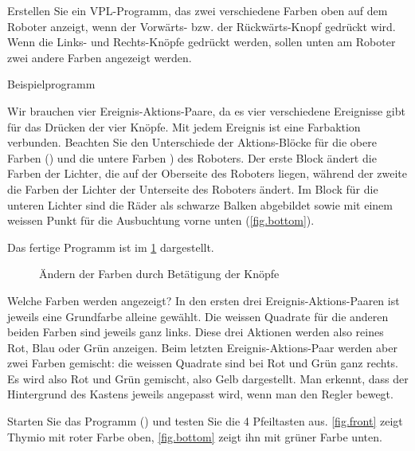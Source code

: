 
\label{ch.colors}


Erstellen Sie ein VPL-Programm, das zwei verschiedene Farben oben auf dem Roboter anzeigt, wenn der Vorwärts- bzw. der Rückwärts-Knopf gedrückt wird. Wenn die Links- und Rechts-Knöpfe gedrückt werden, sollen unten am Roboter zwei andere Farben angezeigt werden.

{\raggedleft \hfill Beispielprogramm }

Wir brauchen vier Ereignis-Aktions-Paare, da es vier verschiedene
Ereignisse gibt für das Drücken der vier Knöpfe. Mit jedem Ereignis ist eine Farbaktion verbunden. Beachten Sie den Unterschiede der Aktions-Blöcke für die obere Farben () und die untere Farben ) des Roboters. Der erste Block ändert die Farben der Lichter, die auf der Oberseite des Roboters liegen, während der zweite die Farben der Lichter der Unterseite des Roboters ändert. Im Block für die unteren Lichter sind die Räder als schwarze Balken abgebildet sowie mit einem weissen Punkt für die Ausbuchtung vorne unten (\cref{fig.bottom}).

Das fertige Programm ist im \cref{fig.colors} dargestellt.

\begin{figure}
	\caption{Ändern der Farben durch Betätigung der Knöpfe}\label{fig.colors}
\end{figure}

Welche Farben werden angezeigt? In den ersten drei Ereignis-Aktions-Paaren ist jeweils eine Grundfarbe alleine gewählt. Die weissen Quadrate für die anderen beiden Farben sind jeweils ganz links. Diese drei Aktionen werden also reines Rot, Blau oder Grün anzeigen. Beim letzten Ereignis-Aktions-Paar werden aber zwei Farben gemischt: die weissen Quadrate sind bei Rot und Grün ganz rechts. Es wird also Rot und Grün gemischt, also Gelb dargestellt. Man erkennt, dass der Hintergrund des Kastens jeweils angepasst wird, wenn man den Regler bewegt. 

Starten Sie das Programm () und testen Sie die 4 Pfeiltasten aus. \cref{fig.front} zeigt Thymio mit roter Farbe oben, \cref{fig.bottom} zeigt ihn mit grüner Farbe unten.


